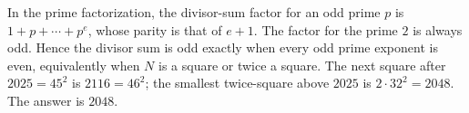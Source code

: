 In the prime factorization, the divisor-sum factor for an odd prime $p$ is $1+p+\cdots+p^e$, whose parity is that of $e+1$. The factor for the prime $2$ is always odd. Hence the divisor sum is odd exactly when every odd prime exponent is even, equivalently when $N$ is a square or twice a square. The next square after $2025=45^2$ is $2116=46^2$; the smallest twice-square above $2025$ is $2\cdot32^2=2048$. The answer is $\boxed{2048}$.
